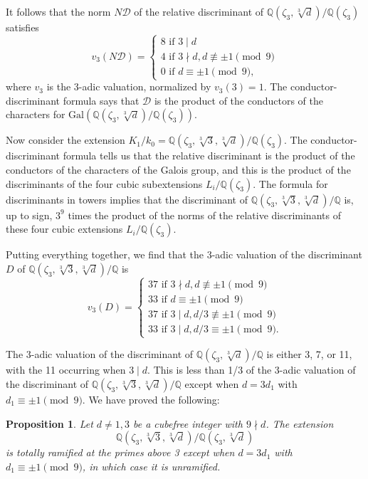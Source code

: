 \documentclass{amsart}
\newtheorem{proposition}[theorem]{Proposition}
\begin{document}
It follows that the norm ${N\mathcal D}$ of the relative discriminant
of $\mathbb Q(\zeta_3,\sqrt[3]{d})/\mathbb Q(\zeta_3)$ satisfies
$$
v_3(N{\mathcal D}) = \begin{cases} 8 \text{ if } 3\mid d\\  4\text{ if } 3\nmid d, d\not\equiv \pm 1\pmod 9\\
0 \text{ if } d\equiv \pm 1\pmod 9,\end{cases}
$$
where $v_3$ is the 3-adic valuation, normalized by $v_3(3)=1$.
The conductor-discriminant formula says that ${\mathcal D}$ is the product of the conductors of the characters
for $\text{Gal}(\mathbb Q(\zeta_3,\sqrt[3]{d})/\mathbb Q(\zeta_3))$. 

Now consider the extension $K_1/k_0=\mathbb Q(\zeta_3, \sqrt[3]{3}, \sqrt[3]{d})/\mathbb Q(\zeta_3)$. The conductor-discriminant formula
tells us that the relative discriminant is the product of the conductors of the characters of the Galois group, and this is the product of
the discriminants of the four cubic subextensions $L_i/\mathbb Q(\zeta_3)$. The formula for discriminants in towers implies that
the discriminant of $\mathbb Q(\zeta_3, \sqrt[3]{3},\sqrt[3]{d})/\mathbb Q$ is, up to sign,
$3^9$ times the product of the norms of the relative discriminants of these four cubic extensions $L_i/\mathbb Q(\zeta_3)$.

Putting everything together, 
we find that the 3-adic valuation of the discriminant $D$ of  $\mathbb Q(\zeta_3, \sqrt[3]{3},\sqrt[3]{d})/\mathbb Q$ is
$$
v_3(D) = \begin{cases} 37 \text{ if } 3\nmid d, d\not\equiv \pm 1\pmod 9\\
33 \text{ if } d\equiv \pm 1\pmod 9\\
37 \text{ if } 3\mid d, d/3\not\equiv \pm 1\pmod 9\\
33 \text{ if } 3\mid d,  d/3\equiv \pm 1\pmod 9.
\end{cases}
$$

The 3-adic valuation of the discriminant of $\mathbb Q(\zeta_3, \sqrt[3]{d})/\mathbb Q$ is either 3, 7, or 11,
with the 11 occurring when $3\mid d$. This is less than 1/3 of the 3-adic valuation of the discriminant of
$\mathbb Q(\zeta_3,\sqrt[3]{3}, \sqrt[3]{d})/\mathbb Q$ except when $d=3d_1$ with $d_1\equiv \pm 1\pmod 9$.
We have proved the following:
\begin{proposition}
Let $d\ne 1, 3$ be a cubefree integer with $9\nmid d$. The extension 
$$
\mathbb Q(\zeta_3, \sqrt[3]{3}, \sqrt[3]{d})/\mathbb Q(\zeta_3, \sqrt[3]{d})
$$
is totally ramified at the primes above 3 except when $d=3d_1$ with $d_1\equiv \pm 1\pmod 9$, in which case it is
unramified.
\end{proposition}
\end{document}
